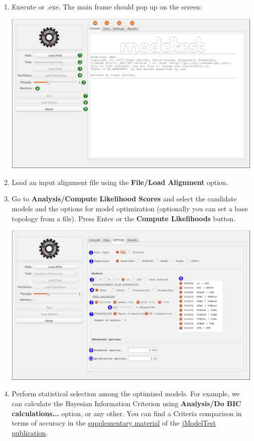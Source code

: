 \begin{enumerate}
\item Execute \modeltestguibin or \modeltestguibin.exe. The main \modeltest frame should pop up on the screen:

\begin{center}
\includegraphics[width=.9\textwidth]{images/main-window}
\end{center}

\item Load an input alignment file using the {\bf File/Load Alignment} option.

\item Go to {\bf Analysis/Compute Likelihood Scores} and select the candidate models and the options for model optimization (optionally you can set a base topology from a file). Press Enter or the {\bf Compute Likelihoods} button.

\begin{center}
\includegraphics[width=.6\textwidth]{images/lkl-settings}
\end{center}

\item Perform statistical selection among the optimized models. For example, we can calculate the Bayesian Information Criterion using {\bf Analysis/Do BIC calculations...} option, or any other. You can find a Criteria comparison in terms of accuracy in the \href{http://www.nature.com/nmeth/journal/v9/n8/extref/nmeth.2109-S1.pdf}{supplementary material} of the \href{http://www.nature.com/nmeth/journal/v9/n8/full/nmeth.2109.html}{jModelTest publication}.


\end{enumerate}
